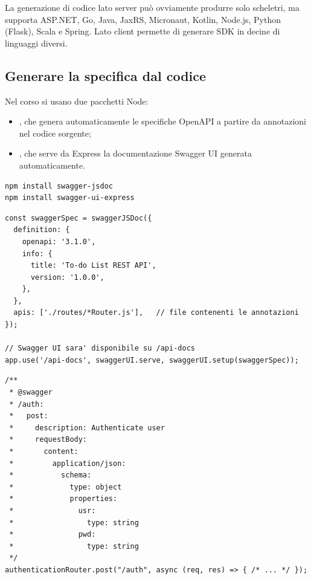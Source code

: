 La generazione di codice lato server può ovviamente produrre solo scheletri, ma
supporta ASP.NET, Go, Java, JaxRS, Micronaut, Kotlin, Node.js, Python (Flask),
Scala e Spring. Lato client permette di generare SDK in decine di linguaggi
diversi.


\subsection{Generare la specifica dal codice}

Nel corso si usano due pacchetti Node:

\begin{itemize}
  \item {}, che genera automaticamente le specifiche OpenAPI a
        partire da annotazioni nel codice sorgente;
  \item {}, che serve da Express la documentazione
        Swagger UI generata automaticamente.
\end{itemize}

\begin{lstlisting}[style=shell]
npm install swagger-jsdoc
npm install swagger-ui-express
\end{lstlisting}

\begin{lstlisting}[style=js, name=index.js]
const swaggerSpec = swaggerJSDoc({
  definition: {
    openapi: '3.1.0',
    info: {
      title: 'To-do List REST API',
      version: '1.0.0',
    },
  },
  apis: ['./routes/*Router.js'],   // file contenenti le annotazioni
});

// Swagger UI sara' disponibile su /api-docs
app.use('/api-docs', swaggerUI.serve, swaggerUI.setup(swaggerSpec));
\end{lstlisting}

\begin{lstlisting}[style=js, name=routes/authenticationRouter.js]
/**
 * @swagger
 * /auth:
 *   post:
 *     description: Authenticate user
 *     requestBody:
 *       content:
 *         application/json:
 *           schema:
 *             type: object
 *             properties:
 *               usr:
 *                 type: string
 *               pwd:
 *                 type: string
 */
authenticationRouter.post("/auth", async (req, res) => { /* ... */ });
\end{lstlisting}

